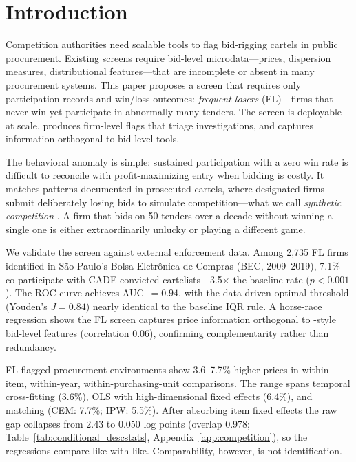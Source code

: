 \section{Introduction}
\label{sec:intro}

Competition authorities need scalable tools to flag bid-rigging
cartels in public procurement. Existing screens
\citep{imhof2019detecting, huber2019machine} require bid-level
microdata---prices, dispersion measures, distributional
features---that are incomplete or absent in many procurement systems.
This paper proposes a screen that requires only participation records
and win/loss outcomes: \emph{frequent losers} (FL)---firms that never
win yet participate in abnormally many tenders. The screen is
deployable at scale, produces firm-level flags that triage
investigations, and captures information orthogonal to bid-level tools.

The behavioral anomaly is simple: sustained participation with a zero
win rate is difficult to reconcile with profit-maximizing entry when
bidding is costly. It matches patterns documented in prosecuted
cartels, where designated firms submit deliberately losing bids to
simulate competition---what we call \emph{synthetic competition}
\citep{marshall2012economics, asker2010leniency}. A firm that bids on
50 tenders over a decade without winning a single one is either
extraordinarily unlucky or playing a different game.

We validate the screen against external enforcement data. Among
2,735 FL firms identified in S\~ao Paulo's Bolsa Eletr\^onica de
Compras (BEC, 2009--2019), 7.1\% co-participate with
CADE-convicted cartelists---3.5$\times$ the baseline rate
($p < 0.001$). The ROC curve achieves AUC~$= 0.94$, with the
data-driven optimal threshold (Youden's $J = 0.84$) nearly
identical to the baseline IQR rule. A horse-race regression
shows the FL screen captures price information orthogonal to
\citet{imhof2019detecting}-style bid-level features (correlation
0.06), confirming complementarity rather than redundancy.

FL-flagged procurement environments show 3.6--7.7\% higher prices in
within-item, within-year, within-purchasing-unit comparisons. The range
spans temporal cross-fitting (3.6\%), OLS with high-dimensional fixed
effects (6.4\%), and matching (CEM: 7.7\%; IPW: 5.5\%). After
absorbing item fixed effects the raw gap collapses from 2.43 to 0.050
log points (overlap 0.978; Table~\ref{tab:conditional_descstats},
Appendix~\ref{app:competition}), so the regressions compare like with
like. Comparability, however, is not identification.

